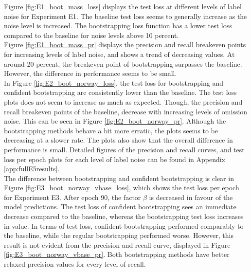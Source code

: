 Figure \ref{fig:E1_boot_mass_loss} displays the test loss at different levels of label noise for Experiment E1. The baseline test loss seems to generally increase as the noise level is increased. The bootstrapping loss function has a lower test loss compared to the baseline for noise levels above 10 percent.\\

Figure \ref{fig:E1_boot_mass_pr} displays the precision and recall breakeven points for increasing levels of label noise, and shows a trend of decreasing values.  At around 20 percent, the breakeven point of bootstrapping surpasses the baseline. However, the difference in performance seems to be small.\\

In Figure \ref{fig:E2_boot_norway_loss}, the test loss for bootstrapping and confident bootstrapping are consistently lower than the baseline. The test loss plots does not seem to increase as much as expected. Though, the precision and recall breakeven points of the baseline, decrease with increasing levels of omission noise. This can be seen in Figure \ref{fig:E2_boot_norway_pr}. Although the bootstrapping methods behave a bit more erratic, the plots seems to be decreasing at a slower rate. The plots also show that the overall difference in performance is small. Detailed figures of the precision and recall curves, and test loss per epoch plots for each level of label noise can be found in Appendix \ref{app:fullE5results}. \\

The difference between bootstrapping and confident bootstrapping is clear in Figure \ref{fig:E3_boot_norway_vbase_loss}, which shows the test loss per epoch for Experiment E3. After epoch 90, the factor $\beta$ is decreased in favour of the model predictions. The test loss of confident bootstrapping sees an immediate decrease compared to the baseline, whereas the bootstrapping test loss increases in value. In terms of test loss, confident bootstrapping performed comparably to the baseline, while the regular bootstrapping performed worse. However, this result is not evident from the precision and recall curve, displayed in Figure \ref{fig:E3_boot_norway_vbase_pr}. Both bootstrapping methods have better relaxed precision values  for every level of recall. \\


